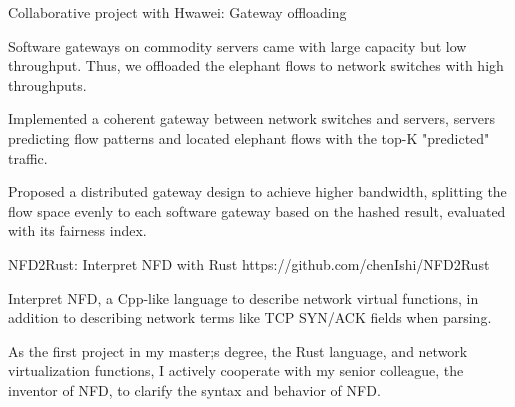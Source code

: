 \begin{cventries}
      \vspace{-3mm}
  
      \cventry
        {} %
        {Collaborative project with Hwawei: Gateway offloading} %
        {} %
        {} %
        {
          \vspace{-2mm}
          \begin{cvitems} %
            \item {Software gateways on commodity servers came with large capacity but low throughput. Thus, we offloaded the elephant flows to network switches with high throughputs.}
            \item {Implemented a coherent gateway between network switches and servers, servers predicting flow patterns and located elephant flows with the top-K "predicted" traffic.}
            \item {Proposed a distributed gateway design to achieve higher bandwidth, splitting the flow space evenly to each software gateway based on the hashed result, evaluated with its fairness index.}
          \end{cvitems}
        }

        \vspace{-3mm}
  
        \cventry
          {} %
          {NFD2Rust: Interpret NFD with Rust} %
          {} %
          {https://github.com\linebreak/chenIshi/NFD2Rust} %
          {
            \vspace{-2mm}
            \begin{cvitems} %
              \item {Interpret NFD, a Cpp-like language to describe network virtual functions, in addition to describing network terms like TCP SYN/ACK fields when parsing.}
              \item {As the first project in my master;s degree, the Rust language, and network virtualization functions, I actively cooperate with my senior colleague, the inventor of NFD, to clarify the syntax and behavior of NFD.}
            \end{cvitems}
          }

          \vspace{-3mm}


\end{cventries}
